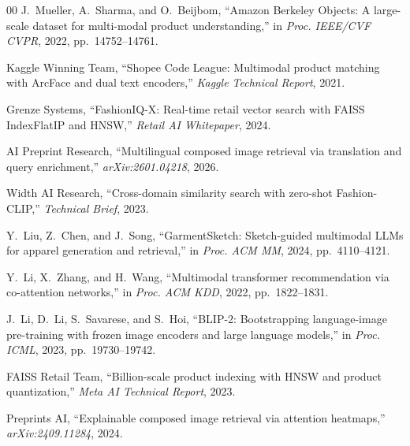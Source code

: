 \documentclass[conference]{IEEEtran}
\begin{document}
\begin{thebibliography}{00}
J.~Mueller, A.~Sharma, and O.~Beijbom, ``Amazon Berkeley Objects: A large-scale dataset for multi-modal product understanding,'' in \emph{Proc. IEEE/CVF CVPR}, 2022, pp.~14752--14761.

Kaggle Winning Team, ``Shopee Code League: Multimodal product matching with ArcFace and dual text encoders,'' \emph{Kaggle Technical Report}, 2021.

Grenze Systems, ``FashionIQ-X: Real-time retail vector search with FAISS IndexFlatIP and HNSW,'' \emph{Retail AI Whitepaper}, 2024.

AI Preprint Research, ``Multilingual composed image retrieval via translation and query enrichment,'' \emph{arXiv:2601.04218}, 2026.

Width AI Research, ``Cross-domain similarity search with zero-shot Fashion-CLIP,'' \emph{Technical Brief}, 2023.

Y.~Liu, Z.~Chen, and J.~Song, ``GarmentSketch: Sketch-guided multimodal LLMs for apparel generation and retrieval,'' in \emph{Proc. ACM MM}, 2024, pp.~4110--4121.

Y.~Li, X.~Zhang, and H.~Wang, ``Multimodal transformer recommendation via co-attention networks,'' in \emph{Proc. ACM KDD}, 2022, pp.~1822--1831.

J.~Li, D.~Li, S.~Savarese, and S.~Hoi, ``BLIP-2: Bootstrapping language-image pre-training with frozen image encoders and large language models,'' in \emph{Proc. ICML}, 2023, pp.~19730--19742.

FAISS Retail Team, ``Billion-scale product indexing with HNSW and product quantization,'' \emph{Meta AI Technical Report}, 2023.

Preprints AI, ``Explainable composed image retrieval via attention heatmaps,'' \emph{arXiv:2409.11284}, 2024.

\end{thebibliography}
\end{document}
